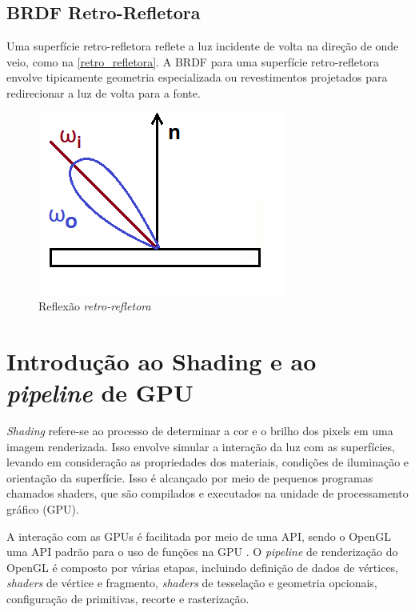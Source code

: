 \documentclass[english, 
               brazil, 
               bsc] %
               {dcomp-abntex2}
\begin{document}
\subsection{BRDF Retro-Refletora}
Uma superfície retro-refletora reflete a luz incidente de volta na direção de onde veio, como na \autoref{retro_refletora}. A BRDF para uma superfície retro-refletora envolve tipicamente geometria especializada ou revestimentos projetados para redirecionar a luz de volta para a fonte.


\begin{figure}[H]
  \caption{\label{retro_refletora} \small Reflexão \textit{retro-refletora}}
        \begin{center}
            \includegraphics[scale=0.5]{./Imagens/retro-reflection-2d.png}
        \end{center}
\end{figure}




\section{Introdução ao Shading e ao \textit{pipeline} de GPU} \label{shading}


\textit{Shading} refere-se ao processo de determinar a cor e o brilho dos pixels em uma imagem renderizada. Isso envolve simular a interação da luz com as superfícies, levando em consideração as propriedades dos materiais, condições de iluminação e orientação da superfície. Isso é alcançado por meio de pequenos programas chamados shaders, que são compilados e executados na unidade de processamento gráfico (GPU).




A interação com as GPUs é facilitada por meio de uma 
API, sendo o OpenGL uma API padrão para o uso de funções na GPU \cite{opengl_spec}. O \textit{pipeline} de renderização do OpenGL é composto por várias etapas, incluindo definição de dados de vértices, \textit{shaders} de vértice e fragmento, \textit{shaders} de tesselação e geometria opcionais, configuração de primitivas, recorte e rasterização.
\end{document}
